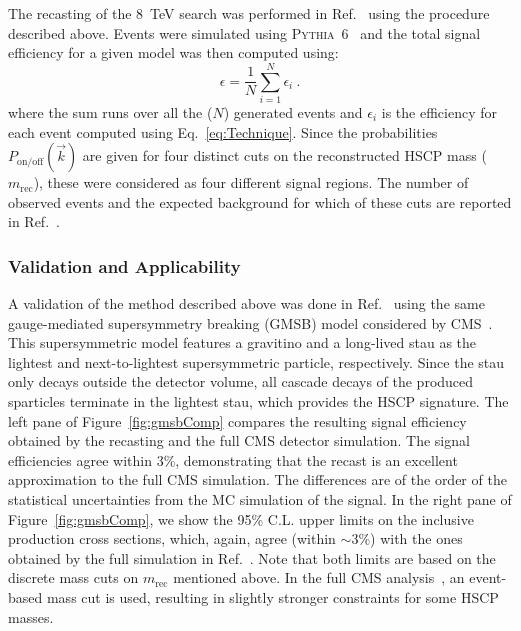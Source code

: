 The recasting of the 8~TeV search was performed in Ref.~\cite{Heisig:2015yla}
using the procedure described above.
Events were simulated using \textsc{Pythia}~6~\cite{Sjostrand:2006za} and
the total signal efficiency for a given model was then computed using:
%
\begin{equation*}
\epsilon = \frac{1}{N} \sum_{i=1}^{N} \epsilon_i~.
\end{equation*}
%
where the sum runs over all the ($N$) generated events and $\epsilon_i$ is the
efficiency for each event computed using Eq.~\eqref{eq:Technique}.
Since the probabilities $P_{\text{on/off}}(\vec{k})$ are given for
four distinct cuts on the reconstructed HSCP mass ($m_\text{rec}$),
these were considered as four different signal regions.
The number of observed events and the expected background for which
of these cuts are reported in Ref.~\cite{Khachatryan:2015lla}.

\subsubsection{Validation and Applicability}
\label{sec:ch5-validate}

A validation of the method described above was
done in Ref.~\cite{Heisig:2015yla} using the same gauge-mediated supersymmetry
breaking (GMSB) model considered by CMS~\cite{Khachatryan:2015lla}.
This supersymmetric model features a gravitino and a long-lived stau as the lightest and next-to-lightest
supersymmetric particle, respectively.
Since the stau only decays outside the detector volume, all
cascade decays of the produced sparticles terminate in the lightest stau,
which provides the HSCP signature.
The left pane of Figure~\ref{fig:gmsbComp} compares the
resulting signal efficiency
obtained by the recasting and the full CMS detector
simulation. The signal efficiencies agree within 3\%, demonstrating
that the recast is an excellent approximation to the full CMS simulation. 
The differences are of the order of
the statistical uncertainties from the MC simulation of the signal.
In the right pane of Figure~\ref{fig:gmsbComp}, we show the 95\% C.L. upper
limits on the inclusive production cross sections, which, again, agree
(within $\sim 3\%$) with the ones obtained by the full simulation in
Ref.~\cite{Khachatryan:2015lla}.
Note that both limits are based on the discrete mass cuts on $m_\text{rec}$ mentioned
above. In the full CMS analysis~\cite{Chatrchyan:2013oca}, an event-based
mass cut is used, resulting in slightly stronger constraints for some HSCP masses.

